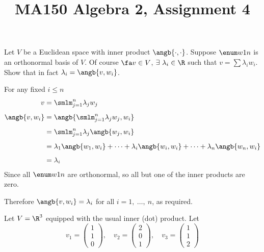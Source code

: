 \documentclass[a4paper]{article}
\title{MA150 Algebra 2, Assignment 4}
\begin{document}
\maketitle

\setlength{\parindent}{0em}
\setlength{\parskip}{1em}


\begin{questionbody}
Let $V$ be a Euclidean space with inner product $\angb{\cdot, \cdot}$. Suppose $\enum w1n$ is an orthonormal basis of $V$. Of course $\fa v \in V$, $\exists\ \lambda_i \in \R$ such that $v = \sum \lambda_i w_i$. Show that in fact $\lambda_i = \angb{v, w_i}$.
\end{questionbody}

For any fixed $i \le n$ \begin{align*}
v &= \smlm_{j=1}^n \lambda_j w_j \\[1ex]
\angb{v, w_i} &= \angb{\smlm_{j=1}^n \lambda_j w_j, w_i} \\[1ex]
&= \smlm_{j=1}^n \lambda_j \angb{w_j, w_i} \\[1ex]
&= \lambda_1 \angb{w_1, w_i} + \cdots + \lambda_i \angb{w_i, w_i} + \cdots + \lambda_n \angb{w_n, w_i} \\[1ex]
&= \lambda_i
\end{align*}
Since all $\enum w1n$ are orthonormal, so all but one of the inner products are zero.

Therefore $\angb{v, w_i} = \lambda_i$ for all $i = 1,\ \ldots,\ n$, as required.


\begin{questionbody}
Let $V = \R^3$ equipped with the usual inner (dot) product. Let \[
v_1 = \begin{pmatrix}1 \\ 1 \\ 0\end{pmatrix},
\quad v_2 = \begin{pmatrix}2 \\ 0 \\ 1\end{pmatrix},
\quad v_3 = \begin{pmatrix}1 \\ 1 \\ 2\end{pmatrix}
\]
\end{questionbody}

\subsection{~} %
\end{document}
